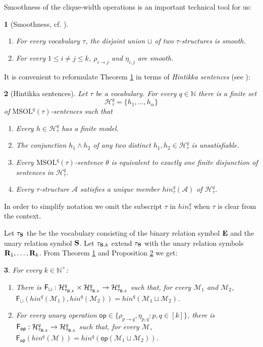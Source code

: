 \documentclass{llncs}
\newtheorem{thm}{\protect\theoremname}
\newtheorem{prop}[thm]{\protect\propositionname}
\renewcommand{\mp}{\mathsf{F}}
\newcommand{\MSOL}{\mathrm{MSOL}}
\newcommand{\N}{\mathbb{N}}
\providecommand{\propositionname}{Proposition}
\providecommand{\theoremname}{Theorem}
\begin{document}
Smoothness
of the clique-width operations is an important technical tool for
us:
\begin{thm}
[Smoothness, cf. \cite{makowsky2004algorithmic}] \label{th:smooth}~
\begin{enumerate}
\item For every vocabulary $\tau$, the disjoint union $\sqcup$ of two
$\tau$-structures is smooth. 
\item For every $1\leq i\not=j\leq k$, $\rho_{i\to j}$ and $\eta_{i,j}$
are smooth. 
\end{enumerate}
\end{thm}
It is convenient to reformulate Theorem \ref{th:smooth} in terms
of {\em Hintikka sentences} (see \cite{bk:EF2005}):
\begin{prop}
[Hintikka sentences] \label{prop:Hin}  Let $\tau$ be a vocabulary.
For every $q\in\N$ there is a finite set
\[
\mathcal{H}_{\tau}^{q}=\{h_{1},\ldots,h_{\alpha}\}
\]
 of $\MSOL^{q}(\tau)$-sentences such that
\begin{enumerate}
\item Every $h\in\mathcal{H}_{\tau}^{q}$ has a finite model.
\item The conjunction $h_{1}\land h_{2}$ of any two distinct $h_{1},h_{2}\in\mathcal{H}_{\tau}^{q}$
is unsatisfiable.
\item Every $\MSOL^{q}(\tau)$-sentence $\theta$ is equivalent to exactly
one finite disjunction of sentences in $\mathcal{H}_{\tau}^{q}$.
\item Every $\tau$-structure $\mathcal{A}$ satisfies a unique member $hin_\tau^{q}(\mathcal{A})$
of $\mathcal{H}_{\tau}^{q}$.
\end{enumerate}
\end{prop}
In order to simplify notation we omit the subscript $\tau$ in $hin_\tau^{q}$ when $\tau$ is clear from the context.


Let $\tau_{{\bf S}}$ the be the vocabulary consisting of the binary relation
symbol ${\bf E}$ and the unary relation symbol ${\bf S}$.
Let $\tau_{{\bf S},k}$ extend $\tau_{{\bf S}}$ with the unary relation
symbols $\mathbf{R}_{1},\ldots,{\bf R}_{k}$. 
From Theorem \ref{th:smooth} and Proposition \ref{prop:Hin} we get:
\begin{thm}
For every $k\in \mathbb{N}^+$:
\begin{enumerate}
\item There is $\mp_{\sqcup}:\mathcal{H}_{\tau_{{\bf S},k}}^{q}\times\mathcal{H}_{\tau_{{\bf S},k}}^{q}\to\mathcal{H}_{\tau_{{\bf S},k}}^{q}$
such that, for every $\mathcal{M}_{1}$ and $\mathcal{M}_{2}$, 
\newline
$\mp_{\sqcup}(hin^{q}(\mathcal{M}_{1}),hin^{q}(\mathcal{M}_{2}))=hin^{q}(\mathcal{M}_{1}\sqcup\mathcal{M}_{2})$. 
\item For every unary operation $\mathsf{op}\in\{\rho_{p\to q},\eta_{p,q}:p,q\in[k]\}$,
there is $\mp_{\mathsf{op}}:\mathcal{H}_{\tau_{{\bf S},k}}^{q}\to\mathcal{H}_{\tau_{{\bf S},k}}^{q}$
such that, for every $\mathcal{M}$, $\mp_{\mathsf{op}}(hin^{q}(\mathcal{M}))=hin^{q}(\mathsf{op}(\mathcal{M}_{1}\sqcup\mathcal{M}_{2}))$. 
\end{enumerate}
\end{thm}
\end{document}
